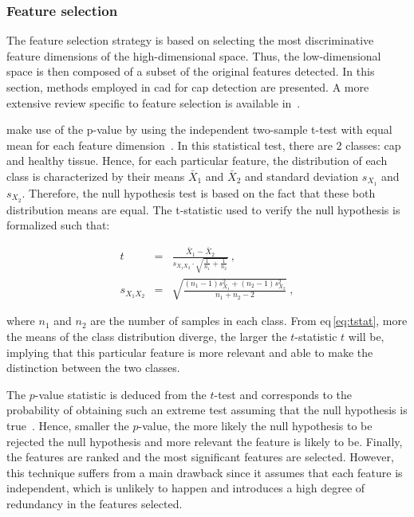 \subsubsection{Feature selection}\label{subsubsec:chp3:img-clas:CADX:fea-ext:sel}
The feature selection strategy is based on selecting the most discriminative feature dimensions of the high-dimensional space.
Thus, the low-dimensional space is then composed of a subset of the original features detected.
In this section, methods employed in \ac{cad} for \ac{cap} detection are presented.
A more extensive review specific to feature selection is available in~\cite{Saeys2007}.

\citeauthor{Niaf2012} make use of the p-value by using the independent two-sample t-test with equal mean for each feature dimension~\cite{Niaf2011,Niaf2012}.
In this statistical test, there are 2 classes: \ac{cap} and healthy tissue.
Hence, for each particular feature, the distribution of each class is characterized by their means $\bar{X}_1$ and $\bar{X}_2$ and standard deviation $s_{X_1}$ and $s_{X_2}$.
Therefore, the null hypothesis test is based on the fact that these both distribution means are equal.
The t-statistic used to verify the null hypothesis is formalized such that:

\begin{eqnarray}
t & = & \frac{\bar {X}_1 - \bar{X}_2}{s_{X_1X_2} \cdot \sqrt{\frac{1}{n_1}+\frac{1}{n_2}}} \ , \label{eq:tstat} \\
s_{X_1X_2} & = & \sqrt{\frac{(n_1-1)s_{X_1}^2+(n_2-1)s_{X_2}^2}{n_1+n_2-2}} \ , \nonumber
\end{eqnarray}

\noindent where $n_1$ and $n_2$ are the number of samples in each class.
From \acs{eq}\,\eqref{eq:tstat}, more the means of the class distribution diverge, the larger the $t$-statistic $t$ will be, implying that this particular feature is more relevant and able to make the distinction between the two classes. 

The $p$-value statistic is deduced from the $t$-test and corresponds to the probability of obtaining such an extreme test assuming that the null hypothesis is true~\cite{Goodman1999}.
Hence, smaller the $p$-value, the more likely the null hypothesis to be rejected the null hypothesis and more relevant the feature is likely to be.
Finally, the features are ranked and the most significant features are selected.
However, this technique suffers from a main drawback since it assumes that each feature is independent, which is unlikely to happen and introduces a high degree of redundancy in the features selected.

